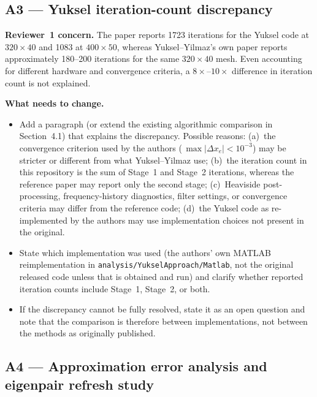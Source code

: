 \documentclass[12pt,a4paper]{article}
\begin{document}
\subsection{A3 — Yuksel iteration-count discrepancy}

\textbf{Reviewer~1 concern.}  The paper reports 1723 iterations for the
Yuksel code at $320{\times}40$ and 1083 at $400{\times}50$, whereas
Yuksel--Yilmaz's own paper reports approximately 180--200 iterations for the
same $320{\times}40$ mesh. Even accounting for different hardware and
convergence criteria, a $8{\times}$--$10{\times}$ difference in iteration
count is not explained.

\textbf{What needs to change.}
\begin{itemize}[leftmargin=1.6em]
  \item Add a paragraph (or extend the existing algorithmic comparison in
        Section~4.1) that explains the discrepancy. Possible reasons:
        (a)~the convergence criterion used by the authors (\,$\max|\Delta
        x_e|<10^{-3}$) may be stricter or different from what Yuksel--Yilmaz
        use; (b)~the iteration count in this repository is the sum of
        Stage~1 and Stage~2 iterations, whereas the reference paper may
        report only the second stage; (c)~Heaviside post-processing,
        frequency-history diagnostics, filter settings, or convergence
        criteria may differ from the reference code; (d)~the Yuksel code as
        re-implemented by the authors may use implementation choices not
        present in the original.
  \item State which implementation was used (the authors' own MATLAB
        reimplementation in \texttt{analysis/YukselApproach/Matlab}, not the
        original released code unless that is obtained and run) and clarify
        whether reported iteration counts include Stage~1, Stage~2, or both.
  \item If the discrepancy cannot be fully resolved, state it as an open
        question and note that the comparison is therefore between
        implementations, not between the methods as originally published.
\end{itemize}

\subsection{A4 — Approximation error analysis and eigenpair refresh study}
\end{document}
